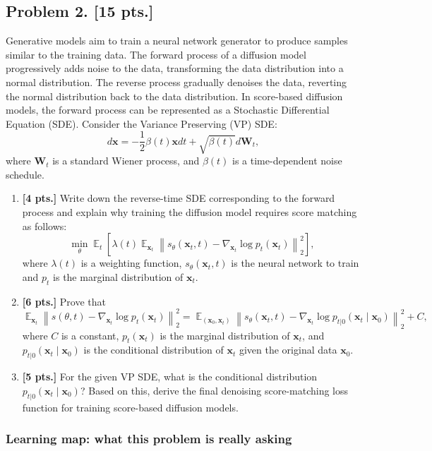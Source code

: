 \documentclass[11pt,a4paper]{article}
\DeclareMathOperator{\E}{\mathbb{E}}
\theoremstyle{definition}
\begin{document}
\subsection{Problem 2. [15 pts.]}
Generative models aim to train a neural network generator to produce samples similar to the training data. The forward process of a diffusion model progressively adds noise to the data, transforming the data distribution into a normal distribution. The reverse process gradually denoises the data, reverting the normal distribution back to the data distribution. In score-based diffusion models, the forward process can be represented as a Stochastic Differential Equation (SDE). Consider the Variance Preserving (VP) SDE:
\[
d\mathbf{x} = -\frac{1}{2}\beta(t)\mathbf{x} dt + \sqrt{\beta(t)} d\mathbf{W}_t,
\]
where $\mathbf{W}_t$ is a standard Wiener process, and $\beta(t)$ is a time-dependent noise schedule.
\begin{enumerate}[label=(\alph*)]
    \item \textbf{[4 pts.]} Write down the reverse-time SDE corresponding to the forward process and explain why training the diffusion model requires score matching as follows:
    \[
    \min_{\theta} \E_t \left[ \lambda(t) \E_{\mathbf{x}_t} \left\| s_\theta(\mathbf{x}_t, t) - \nabla_{\mathbf{x}_t} \log p_t(\mathbf{x}_t) \right\|_2^2 \right],
    \]
    where $\lambda(t)$ is a weighting function, $s_\theta(\mathbf{x}_t, t)$ is the neural network to train and $p_t$ is the marginal distribution of $\mathbf{x}_t$.
    \item \textbf{[6 pts.]} Prove that
    \[
    \E_{\mathbf{x}_t} \left\| s(\theta, t) - \nabla_{\mathbf{x}_t} \log p_t(\mathbf{x}_t) \right\|_2^2 = \E_{(\mathbf{x}_0, \mathbf{x}_t)} \left\| s_\theta(\mathbf{x}_t, t) - \nabla_{\mathbf{x}_t} \log p_{t|0}(\mathbf{x}_t \mid \mathbf{x}_0) \right\|_2^2 + C,
    \]
    where $C$ is a constant, $p_t(\mathbf{x}_t)$ is the marginal distribution of $\mathbf{x}_t$, and $p_{t|0}(\mathbf{x}_t \mid \mathbf{x}_0)$ is the conditional distribution of $\mathbf{x}_t$ given the original data $\mathbf{x}_0$.
    \item \textbf{[5 pts.]} For the given VP SDE, what is the conditional distribution $p_{t|0}(\mathbf{x}_t \mid \mathbf{x}_0)$? Based on this, derive the final denoising score-matching loss function for training score-based diffusion models.
\end{enumerate}

\subsubsection{Learning map: what this problem is really asking}
\end{document}
